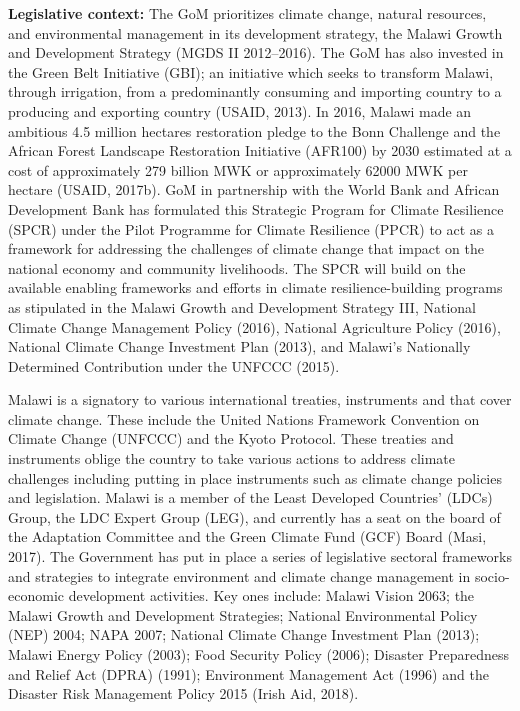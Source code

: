 \documentclass[
]{book}
\begin{document}
\textbf{Legislative context:} The GoM prioritizes climate change, natural resources, and environmental management in its development strategy, the Malawi Growth and Development Strategy (MGDS II 2012--2016). The GoM has also invested in the Green Belt Initiative (GBI); an initiative which seeks to transform Malawi, through irrigation, from a predominantly consuming and importing country to a producing and exporting country (USAID, 2013). In 2016, Malawi made an ambitious 4.5 million hectares restoration pledge to the Bonn Challenge and the African Forest Landscape Restoration Initiative (AFR100) by 2030 estimated at a cost of approximately 279 billion MWK or approximately 62000 MWK per hectare (USAID, 2017b). GoM in partnership with the World Bank and African Development Bank has formulated this Strategic Program for Climate Resilience (SPCR) under the Pilot Programme for Climate Resilience (PPCR) to act as a framework for addressing the challenges of climate change that impact on the national economy and community livelihoods. The SPCR will build on the available enabling frameworks and efforts in climate resilience-building programs as stipulated in the Malawi Growth and Development Strategy III, National Climate Change Management Policy (2016), National Agriculture Policy (2016), National Climate Change Investment Plan (2013), and Malawi's Nationally Determined Contribution under the UNFCCC (2015).

Malawi is a signatory to various international treaties, instruments and that cover climate change. These include the United Nations Framework Convention on Climate Change (UNFCCC) and the Kyoto Protocol. These treaties and instruments oblige the country to take various actions to address climate challenges including putting in place instruments such as climate change policies and legislation. Malawi is a member of the Least Developed Countries' (LDCs) Group, the LDC Expert Group (LEG), and currently has a seat on the board of the Adaptation Committee and the Green Climate Fund (GCF) Board (Masi, 2017). The Government has put in place a series of legislative sectoral frameworks and strategies to integrate environment and climate change management in socio-economic development activities. Key ones include: Malawi Vision 2063; the Malawi Growth and Development Strategies; National Environmental Policy (NEP) 2004; NAPA 2007; National Climate Change Investment Plan (2013); Malawi Energy Policy (2003); Food Security Policy (2006); Disaster Preparedness and Relief Act (DPRA) (1991); Environment Management Act (1996) and the Disaster Risk Management Policy 2015 (Irish Aid, 2018).
\end{document}
